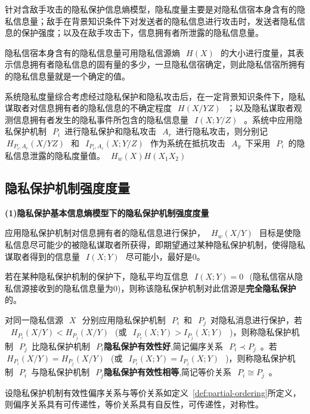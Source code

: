 针对含敌手攻击的隐私保护信息熵模型，隐私度量主要是对隐私信宿本身含有的隐私信息量；敌手在背景知识条件下对发送者的隐私信息进行攻击时，发送者隐私信息的保护强度；以及在敌手攻击下，信息拥有者所泄露的隐私信息量。

隐私信宿本身含有的隐私信息量可用隐私信源熵~$~H(X)~$~的大小进行度量，其表示信息拥有者隐私信息的固有量的多少，一旦隐私信宿确定，则此隐私信宿所拥有的隐私信息量就是一个确定的值。

系统隐私度量综合考虑经过隐私保护和隐私攻击后，在一定背景知识条件下，隐私谋取者对信息拥有者的隐私信息的不确定程度~$~H(X/YZ)~$~；以及隐私谋取者观测信息拥有者发生的隐私事件所包含的隐私信息量~$~I(X;Y/Z)~$~。系统中应用隐私保护机制~$~P_{i}$~进行隐私保护和隐私攻击~$~A_{r}$~进行隐私攻击，则分别记~$~H_{P_{i},A_{r}}(X/YZ)~$~和~$~I_{P_{i},A_{r}}(X;Y/Z)~$~作为系统在抵抗攻击~$~A_{y}$~下采用~$~P_{i}$~的隐私信息泄露的隐私度量值。~$~H_{w}(X)H(X_{1}X_{2})~$~

\subsection{隐私保护机制强度度量}
\textbf{(1)隐私保护基本信息熵模型下的隐私保护机制强度度量}

应用隐私保护机制对信息拥有者的隐私信息进行保护，~$~H_{w}(X/Y)~$~目标是使隐私信息尽可能少的被隐私谋取者所获得，即期望通过某种隐私保护机制，使得隐私谋取者得到的信息量~$~I(X;Y)~$~尽可能小，最好是0。
\begin{definition}
	\label{def:perfec-privacy-preserving}
	若在某种隐私保护机制的保护下，隐私平均互信息~$~I(X;Y)=0~$~(隐私信宿从隐私信源接收到的隐私信息量为0)，则称该隐私保护机制对此信源是\textbf{完全隐私保护}的。
\end{definition}

\begin{definition}
\label{def:partial-ordering}	
	 对同一隐私信源~$~X~$~分别应用隐私保护机制~$~P_{i}$~和~$~P_{j}$~对隐私消息进行保护，若\\~$~H_{P_{i}}(X/Y)<H_{P_{j}}(X/Y)~$~(或~$~I_{P_{i}}(X;Y)>I_{P_{j}}(X;Y)~$~)，则称隐私保护机制~$~P_{j}$~比隐私保护机制~$~P_{i}$\textbf{隐私保护有效性好},简记偏序关系~$~P_{i}\prec P_{j}$~。若~$~H_{P_{i}}(X/Y)=H_{P_{j}}(X/Y)~$~(或~$~I_{P_{i}}(X;Y)=I_{P_{j}}(X;Y)~$~)，则称隐私保护机制~$~P_{i}$~与隐私保护机制~$~P_{j}$\textbf{隐私保护有效性相等},简记等价关系~$~P_{i}\cong P_{j}$~。
\end{definition}

\begin{theorem}
	\label{thm:distance-properties}
	设隐私保护机制有效性偏序关系与等价关系如定义~\ref{def:partial-ordering}所定义，则偏序关系具有可传递性，等价关系具有自反性，可传递性，对称性。
\end{theorem}


